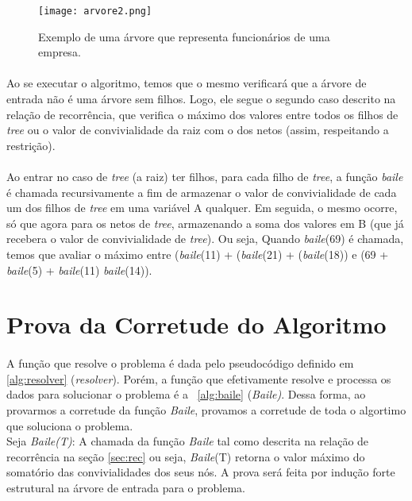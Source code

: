 \documentclass[a4paper]{article}
\begin{document}
\begin{figure}[!htb]
\centering
\texttt{[image: arvore2.png]}
\caption{Exemplo de uma árvore que representa funcionários de uma empresa.}
\label{arvore}
\end{figure}

\paragraph{}Ao se executar o algoritmo, temos que o mesmo verificará que a árvore de entrada não é uma árvore sem filhos. Logo, ele segue o segundo caso descrito na relação de recorrência, que verifica o máximo dos valores entre todos os filhos de \emph{tree} ou o valor de convivialidade da raiz com o dos netos (assim, respeitando a restrição).\\

\paragraph{}Ao entrar no caso de \emph{tree} (a raiz) ter filhos, para cada filho de \emph{tree}, a função \emph{baile} é chamada recursivamente a fim de armazenar o valor de convivialidade de cada um dos filhos de \emph{tree} em uma variável A qualquer. Em seguida, o mesmo ocorre, só que agora para os netos de \emph{tree}, armazenando a soma dos valores em B (que já recebera o valor de convivialidade de \emph{tree}). Ou seja, Quando \emph{baile}(69) é chamada, temos que avaliar o máximo entre (\emph{baile}(11) + (\emph{baile}(21) + (\emph{baile}(18)) e (69 + \emph{baile}(5) + \emph{baile}(11) \emph{baile}(14)).

\newpage
\section{Prova da Corretude do Algoritmo}

\paragraph{}A função que resolve o problema é dada pelo pseudocódigo definido em \ref{alg:resolver} (\emph{resolver}). Porém, a função que efetivamente resolve e processa os dados para solucionar o problema é a ~\ref{alg:baile} (\emph{Baile)}. Dessa forma, ao provarmos a corretude da função \emph{Baile}, provamos a corretude de toda o algortimo que soluciona o problema.\\

Seja \emph{Baile(T)}: A chamada da função \emph{Baile} tal como descrita na relação de recorrência na seção \ref{sec:rec} ou seja, \emph{Baile}(T) retorna o valor máximo do somatório das convivialidades dos seus nós. A prova será feita por indução forte estrutural na árvore de entrada para o problema.\\
\end{document}
